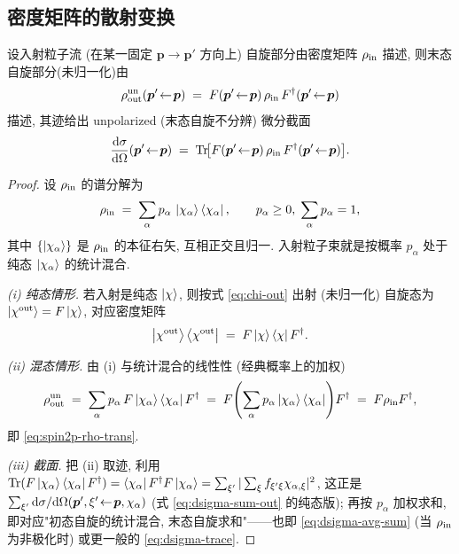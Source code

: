 \subsection{密度矩阵的散射变换}\label{sec:spin2p-rho-trans}

\begin{theorem}\label{thm:spin2p-rho}
设入射粒子流 (在某一固定 $\bm p\to\bm p'$ 方向上) 自旋部分由密度矩阵 $\rho_{\rm in}$ 描述, 则末态自旋部分(未归一化)由
\begin{equation}
  \rho_{\rm out}^{\rm un}(\bm p'\!\leftarrow\!\bm p)\;=\;F(\bm p'\!\leftarrow\!\bm p)\,\rho_{\rm in}\,F^\dagger(\bm p'\!\leftarrow\!\bm p)
  \label{eq:spin2p-rho-trans}
\end{equation}
描述, 其迹给出 unpolarized (末态自旋不分辨) 微分截面
\begin{equation}
  \frac{\mathrm{d}\sigma}{\mathrm{d}\Omega}(\bm p'\!\leftarrow\!\bm p)\;=\;\operatorname{Tr}\!\bigl[F(\bm p'\!\leftarrow\!\bm p)\,\rho_{\rm in}\,F^\dagger(\bm p'\!\leftarrow\!\bm p)\bigr].
  \label{eq:spin2p-rho-cs}
\end{equation}
\end{theorem}

\begin{proof}
设 $\rho_{\rm in}$ 的谱分解为
\begin{equation}
  \rho_{\rm in}\;=\;\sum_{\alpha} p_\alpha\,\ket{\chi_\alpha}\bra{\chi_\alpha},\qquad p_\alpha\ge 0,\;\sum_\alpha p_\alpha=1,
  \label{eq:spin2p-rho-spectral}
\end{equation}
其中 $\{\ket{\chi_\alpha}\}$ 是 $\rho_{\rm in}$ 的本征右矢, 互相正交且归一. 入射粒子束就是按概率 $p_\alpha$ 处于纯态 $\ket{\chi_\alpha}$ 的统计混合.

\emph{(i) 纯态情形.} 若入射是纯态 $\ket\chi$, 则按式 \eqref{eq:chi-out} 出射 (未归一化) 自旋态为 $\ket{\chi^{\rm out}}=F\ket\chi$, 对应密度矩阵
\begin{equation}
  \ket{\chi^{\rm out}}\bra{\chi^{\rm out}}\;=\;F\ket\chi\bra\chi F^\dagger.
\end{equation}

\emph{(ii) 混态情形.} 由 (i) 与统计混合的线性性 (经典概率上的加权)
\begin{equation}
  \rho_{\rm out}^{\rm un}\;=\;\sum_\alpha p_\alpha\,F\ket{\chi_\alpha}\bra{\chi_\alpha}F^\dagger
  \;=\;F\!\left(\sum_\alpha p_\alpha\ket{\chi_\alpha}\bra{\chi_\alpha}\right)\!F^\dagger
  \;=\;F\rho_{\rm in}F^\dagger,
\end{equation}
即 \eqref{eq:spin2p-rho-trans}.

\emph{(iii) 截面.} 把 (ii) 取迹, 利用 $\operatorname{Tr}(F\ket{\chi_\alpha}\bra{\chi_\alpha}F^\dagger)=\bra{\chi_\alpha}F^\dagger F\ket{\chi_\alpha}=\sum_{\xi'}|\sum_\xi f_{\xi'\xi}\chi_{\alpha,\xi}|^2$, 这正是 $\sum_{\xi'}\mathrm{d}\sigma/\mathrm{d}\Omega(\bm p',\xi'\!\leftarrow\!\bm p,\chi_\alpha)$ (式 \eqref{eq:dsigma-sum-out} 的纯态版); 再按 $p_\alpha$ 加权求和, 即对应"初态自旋的统计混合, 末态自旋求和"——也即 \eqref{eq:dsigma-avg-sum} (当 $\rho_{\rm in}$ 为非极化时) 或更一般的 \eqref{eq:dsigma-trace}.
\end{proof}

